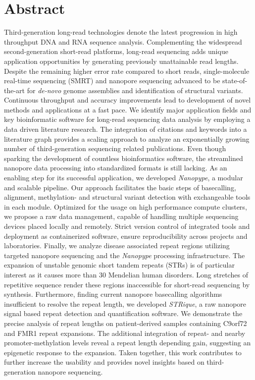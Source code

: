 
\vspace*{2mm}
\section*{Abstract}
\label{sec:abstract}

Third-generation long-read technologies denote the latest progression in high throughput DNA and RNA sequence analysis.
Complementing the widespread second-generation short-read platforms, long-read sequencing adds unique application opportunities by generating previously unattainable read lengths.
Despite the remaining higher error rate compared to short reads, single-molecule real-time sequencing (SMRT) and nanopore sequencing advanced to be state-of-the-art for \textit{de-novo} genome assemblies and identification of structural variants.
Continuous throughput and accuracy improvements lead to development of novel methods and applications at a fast pace.
We identify major application fields and key bioinformatic software for long-read sequencing data analysis by employing a data driven literature research.
The integration of citations and keywords into a literature graph provides a scaling approach to analyze an exponentially growing number of third-generation sequencing related publications.
Even though sparking the development of countless bioinformatics software, the streamlined nanopore data processing into standardized formats is still lacking.
As an enabling step for its successful application, we developed \textit{Nanopype}, a modular and scalable pipeline. 
Our approach facilitates the basic steps of basecalling, alignment, methylation- and structural variant detection with exchangeable tools in each module.
Optimized for the usage on high performance compute clusters, we propose a raw data management, capable of handling multiple sequencing devices placed locally and remotely.
Strict version control of integrated tools and deployment as containerized software, ensure reproducibility across projects and laboratories.
Finally, we analyze disease associated repeat regions utilizing targeted nanopore sequencing and the \textit{Nanopype} processing infrastructure.
The expansion of unstable genomic short tandem repeats (STRs) is of particular interest as it causes more than 30 Mendelian human disorders.
Long stretches of repetitive sequence render these regions inaccessible for short-read sequencing by synthesis.
Furthermore, finding current nanopore basecalling algorithms insufficient to resolve the repeat length, we developed \textit{STRique}, a raw nanopore signal based repeat detection and quantification software.
We demonstrate the precise analysis of repeat lengths on patient-derived samples containing C9orf72 and FMR1 repeat expansions. 
The additional integration of repeat- and nearby promoter-methylation levels reveal a repeat length depending gain, suggesting an epigenetic response to the expansion.
Taken together, this work contributes to further increase the usability and provides novel insights based on third-generation nanopore sequencing.





